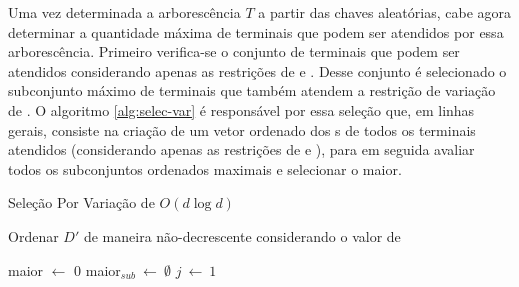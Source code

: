 Uma vez  determinada a arborescência  $T$ a  partir das chaves  aleatórias, cabe
agora determinar  a quantidade máxima de  terminais que podem ser  atendidos por
essa arborescência. Primeiro  verifica-se o conjunto de terminais  que podem ser
atendidos  considerando apenas  as  restrições de  {\delay}  e {\jitter}.  Desse
conjunto é  selecionado o subconjunto máximo  de terminais que também  atendem a
restrição de variação de {\delay}. O algoritmo \ref{alg:selec-var} é responsável
por essa seleção que, em linhas gerais, consiste na criação de um vetor ordenado
dos  {\delay  s}  de  todos  os  terminais  atendidos  (considerando  apenas  as
restrições  de  {\delay}  e  {\jitter}),   para  em  seguida  avaliar  todos  os
subconjuntos ordenados maximais e selecionar o maior.



\begin{algorithm}[!ht]
  \caption{Seleção Por Variação de {\delay} $O(d \log d)$ \label{alg:selec-var}}
  
  Ordenar $D'$ de maneira não-decrescente considerando o valor de \delay \;

  maior $\leftarrow$ 0\;
  maior$_{sub} \ \leftarrow \ \emptyset$\;  
  $j \ \leftarrow \ 1$\;
  \;
\end{algorithm}
\newpage

